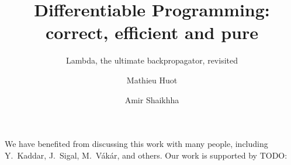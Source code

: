 \documentclass[acmsmall,review,anonymous]{acmart}\settopmatter{printfolios=true,printccs=false,printacmref=false}
\begin{document}
\title{Differentiable Programming: correct, efficient and pure}
\subtitle{Lambda, the ultimate backpropagator, revisited}

\author{Mathieu Huot}

\author{Amir Shaikhha}



\renewcommand{\shortauthors}{Huot, et al.}





\maketitle






\begin{acks}
We have benefited from discussing this work with many people, including Y.~Kaddar, J.~Sigal, M.~V\'ak\'ar, and others. 
Our work is supported by TODO:
\end{acks}


\end{document}
